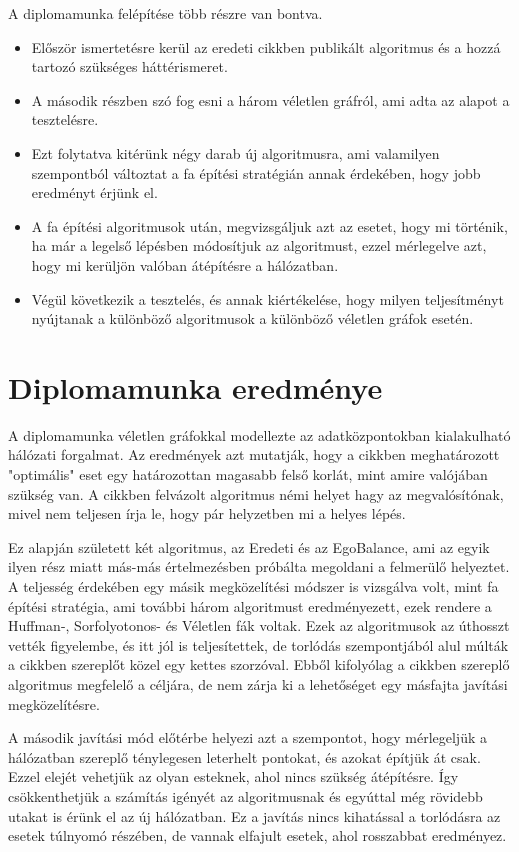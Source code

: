 \documentclass[12pt]{report}
\begin{document}
A diplomamunka felépítése több részre van bontva.
\begin{itemize}
	\item Először ismertetésre kerül az eredeti cikkben \cite{avin_demand-aware_nodate} publikált algoritmus és a hozzá tartozó szükséges háttérismeret.
	\item A második részben szó fog esni a három véletlen gráfról, ami adta az alapot a tesztelésre.
	\item Ezt folytatva kitérünk négy darab új algoritmusra, ami valamilyen szempontból változtat a fa építési stratégián annak érdekében, hogy jobb eredményt érjünk el.
	\item A fa építési algoritmusok után, megvizsgáljuk azt az esetet, hogy mi történik, ha már a legelső lépésben módosítjuk az algoritmust, ezzel mérlegelve azt, hogy mi kerüljön valóban átépítésre a hálózatban.
	\item Végül következik a tesztelés, és annak kiértékelése, hogy milyen teljesítményt nyújtanak a különböző algoritmusok a különböző véletlen gráfok esetén. 
\end{itemize}


\section{Diplomamunka eredménye}

A diplomamunka véletlen gráfokkal modellezte az adatközpontokban kialakulható hálózati forgalmat.
Az eredmények azt mutatják, hogy a cikkben meghatározott "optimális" eset egy határozottan magasabb felső korlát, mint amire valójában szükség van.
A cikkben felvázolt algoritmus némi helyet hagy az megvalósítónak, mivel nem teljesen írja le, hogy pár helyzetben mi a helyes lépés.

Ez alapján született két algoritmus, az Eredeti és az EgoBalance, ami az egyik ilyen rész miatt más-más értelmezésben próbálta megoldani a felmerülő helyeztet.
A teljesség érdekében egy másik megközelítési módszer is vizsgálva volt, mint fa építési stratégia, ami további három algoritmust eredményezett, ezek rendere a Huffman-, Sorfolyotonos- és Véletlen fák voltak.
Ezek az algoritmusok az úthosszt vették figyelembe, és itt jól is teljesítettek, de torlódás szempontjából alul múlták a cikkben szereplőt közel egy kettes szorzóval.
Ebből kifolyólag a cikkben szereplő algoritmus megfelelő a céljára, de nem zárja ki a lehetőséget egy másfajta javítási megközelítésre. 

A második javítási mód előtérbe helyezi azt a szempontot, hogy mérlegeljük a hálózatban szereplő ténylegesen leterhelt pontokat, és azokat építjük át csak.
Ezzel elejét vehetjük az olyan esteknek, ahol nincs szükség átépítésre.
Így csökkenthetjük a számítás igényét az algoritmusnak és egyúttal még rövidebb utakat is érünk el az új hálózatban.
Ez a javítás nincs kihatással a torlódásra az esetek túlnyomó részében, de vannak elfajult esetek, ahol rosszabbat eredményez.
\end{document}
